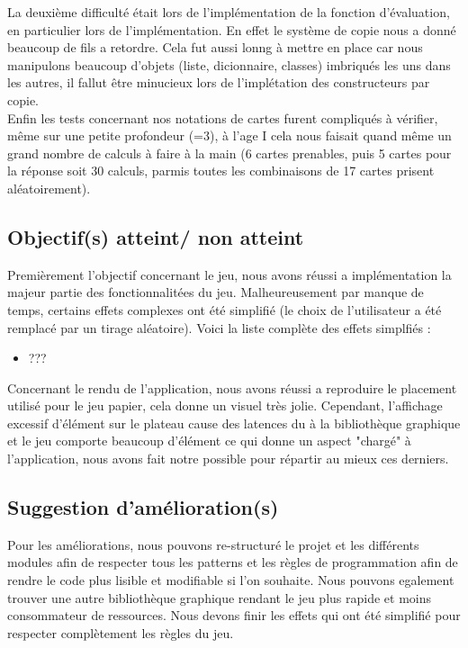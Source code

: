 \documentclass[12pt]{article}
\begin{document}
    	La deuxième difficulté était lors de l'implémentation de la fonction d'évaluation, en particulier lors de l'implémentation. En effet le système de copie nous a donné beaucoup de fils a retordre. Cela fut aussi lonng à mettre en place car nous manipulons beaucoup d'objets (liste, dicionnaire, classes) imbriqués les uns dans les autres, il fallut être minucieux lors de l'implétation des constructeurs par copie. \\
    	Enfin les tests concernant nos notations de cartes furent compliqués à vérifier, même sur une petite profondeur (=3), à l'age I cela nous faisait quand même un grand nombre de calculs à faire à la main (6 cartes prenables, puis 5 cartes pour la réponse soit 30 calculs, parmis toutes les combinaisons de 17 cartes prisent aléatoirement).
	
	\subsection{Objectif(s) atteint/ non atteint}
	    Premièrement l'objectif concernant le jeu, nous avons réussi a implémentation la majeur partie des fonctionnalitées du jeu. Malheureusement par manque de temps, certains effets complexes ont été simplifié (le choix de l'utilisateur a été remplacé par un tirage aléatoire). Voici la liste complète des effets simplfiés : 
	    \begin{itemize}
	        \item ???
	    \end{itemize}
	    Concernant le rendu de l'application, nous avons réussi a reproduire le placement utilisé pour le jeu papier, cela donne un visuel très jolie. Cependant, l'affichage excessif d'élément sur le plateau cause des latences du à la bibliothèque graphique et le jeu comporte beaucoup d'élément ce qui donne un aspect "chargé" à l'application, nous avons fait notre possible pour répartir au mieux ces derniers.
	
	\subsection{Suggestion d'amélioration(s)}
	    Pour les améliorations, nous pouvons re-structuré le projet et les différents modules afin de respecter tous les patterns et les règles de programmation afin de rendre le code plus lisible et modifiable si l'on souhaite. Nous pouvons egalement trouver une autre bibliothèque graphique rendant le jeu plus rapide et moins consommateur de ressources. Nous devons finir les effets qui ont été simplifié pour respecter complètement les règles du jeu. 
	    
        
    \newpage
	\printbibliography
\end{document}

